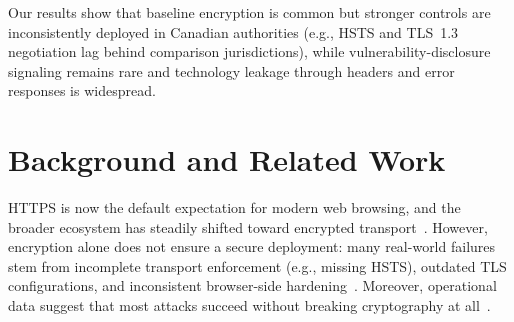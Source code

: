 \documentclass[conference]{IEEEtran}
\begin{document}
  Our results show that baseline encryption is common but stronger controls are inconsistently deployed in Canadian authorities (e.g., HSTS and TLS~1.3 negotiation lag behind comparison jurisdictions), while vulnerability-disclosure signaling remains rare and technology leakage through headers and error responses is widespread. 

\section{Background and Related Work}
  HTTPS is now the default expectation for modern web browsing, and the broader ecosystem has steadily shifted toward encrypted transport~\cite{GoogleTransparencyHTTPS}. 
  However, encryption alone does not ensure a secure deployment: many real-world failures stem from incomplete transport enforcement (e.g., missing HSTS), outdated TLS configurations, and inconsistent browser-side hardening~\cite{CloudflareRadarAppLayer}. 
  Moreover, operational data suggest that most attacks succeed without breaking cryptography at all~\cite{CloudflareRadarAppLayer}. 
  
\end{document}
